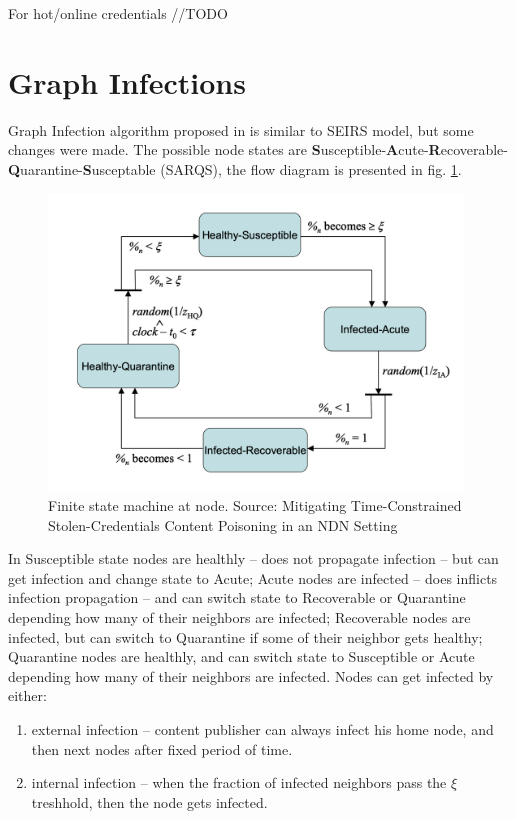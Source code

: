 \documentclass[nostrict]{szablonPG}
\begin{document}
For hot/online credentials 
//TODO


\section{Graph Infections}
Graph Infection algorithm proposed in \cite{konorski2019mitigating} is similar to SEIRS model, but some changes were made. The possible node states are \textbf{S}usceptible-\textbf{A}cute-\textbf{R}ecoverable-\textbf{Q}uarantine-\textbf{S}usceptable (SARQS), the flow diagram is presented in fig. \ref{fig:finite-state-machine-jekon}.
\begin{figure}[h!]
    \includegraphics[width=11cm]{img/finite-state-at-node.png}
    \centering
    \caption{Finite state machine at node. Source: Mitigating Time-Constrained Stolen-Credentials Content Poisoning in an NDN Setting \cite{konorski2019mitigating}}
    \label{fig:finite-state-machine-jekon}
\end{figure} 
In Susceptible state nodes are healthly -- does not propagate infection -- but can get infection and change state to Acute; Acute nodes are infected -- does inflicts infection propagation -- and can switch state to Recoverable or Quarantine depending how many of their neighbors are infected; Recoverable nodes are infected, but can switch to Quarantine if some of their neighbor gets healthy; Quarantine nodes are healthly, and can switch state to Susceptible or Acute depending how many of their neighbors are infected. 
Nodes can get infected by either:
\begin{enumerate}
    \item external infection -- content publisher can always infect his home node, and then next nodes after fixed period of time.
    \item internal infection -- when the fraction of infected neighbors pass the $\xi$ treshhold, then the node gets infected. 
\end{enumerate}
\end{document}
